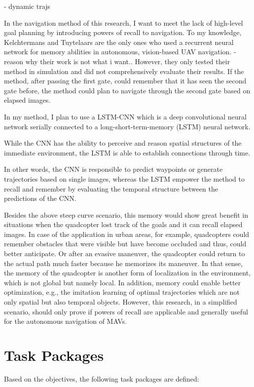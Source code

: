 - dynamic trajs

In the navigation method of this research, I want to meet the lack of high-level goal planning 
by introducing powers of recall to navigation.
To my knowledge, Kelchtermans and Tuytelaars \cite{Kelchtermans2017}
are the only ones who used a recurrent neural network for memory abilities in autonomous, 
vision-based UAV navigation. \cite{Shakeri2019}
-reason why their work is not what i want..
However, they only tested their method in simulation and did not comprehensively evaluate their results.
If the method, after passing the first gate, could remember that it has seen the second gate before,
the method could plan to navigate through the second gate based on elapsed images.




In my method, I plan to use a LSTM-CNN which is a deep convolutional neural network
serially connected to a long-short-term-memory (LSTM) neural network.

While the CNN has the ability to perceive and reason spatial structures of the immediate environment,
the LSTM is able to establish connections through time. 

In other words, the CNN is responsible to predict waypoints 
or generate trajectories based on single images,
whereas the LSTM empower the method to recall and remember 
by evaluating the temporal structure between the predictions of the CNN.

Besides the above steep curve scenario, this memory would show great benefit in situations
when the quadcopter lost track of the goals and it can recall elapsed images.
In case of the application in urban areas, for example, 
quadcopters could remember obstacles 
that were visible but have become occluded and thus, could better anticipate. 
Or after an evasive maneuver, 
the quadcopter could return to the actual path 
much faster because he memorizes its maneuver.
In that sense, the memory of the quadcopter is another form of localization in the environment, 
which is not global but namely local.
In addition, memory could enable better optimization, e.g., 
the imitation learning of optimal trajectories which
are not only spatial but also temporal objects.
However, this research, in a simplified scenario, should only prove if powers of recall 
are applicable and generally useful for the autonomous navigation of MAVs.

\chapter{Task Packages}
Based on the objectives, the following task packages are defined:

